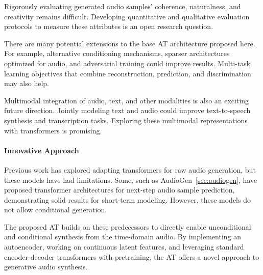 Rigorously evaluating generated audio samples' coherence, naturalness, and creativity remains difficult. Developing quantitative and qualitative evaluation protocols to measure these attributes is an open research question.

There are many potential extensions to the base \ac{AT} architecture proposed here. For example, alternative conditioning mechanisms, sparser architectures optimized for audio, and adversarial training could improve results. Multi-task learning objectives that combine reconstruction, prediction, and discrimination may also help.

Multimodal integration of audio, text, and other modalities is also an exciting future direction. Jointly modeling text and audio could improve text-to-speech synthesis and transcription tasks. Exploring these multimodal representations with transformers is promising.

\paragraph{Innovative Approach}
Previous work has explored adapting transformers for raw audio generation, but these models have had limitations. Some, such as AudioGen~\ref{sec:audiogen}, have proposed transformer architectures for next-step audio sample prediction, demonstrating solid results for short-term modeling. However, these models do not allow conditional generation.

The proposed \ac{AT} builds on these predecessors to directly enable unconditional and conditional synthesis from the time-domain audio. By implementing an autoencoder, working on continuous latent features, and leveraging standard encoder-decoder transformers with pretraining, the \ac{AT} offers a novel approach to generative audio synthesis.